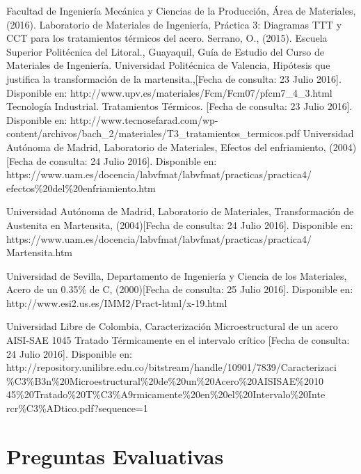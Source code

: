 \documentclass[a4paper, 9pt]{article}
\begin{document}
\newpage
\begin{thebibliography}{9}
  Facultad de Ingeniería Mecánica y Ciencias de la Producción, Área de Materiales, (2016). Laboratorio de Materiales de Ingeniería, Práctica 3: Diagramas TTT y CCT para los tratamientos térmicos del acero.	  
Serrano, O., (2015). Escuela Superior Politécnica del Litoral., Guayaquil, Guía de Estudio del Curso de Materiales de Ingeniería.
Universidad Politécnica de Valencia, Hipótesis que justifica la transformación de la martensita.,[Fecha de consulta: 23 Julio 2016]. Disponible en: http://www.upv.es/materiales/Fcm/Fcm07/pfcm7\_4\_3.html
Tecnología Industrial. Tratamientos Térmicos. [Fecha de consulta: 23 Julio 2016]. Disponible en: http://www.tecnosefarad.com/wp-content/archivos/bach\_2/materiales/T3\_tratamientos\_termicos.pdf
Universidad Autónoma de Madrid, Laboratorio de Materiales, Efectos del enfriamiento, (2004)[Fecha de consulta: 24 Julio 2016]. Disponible en: https://www.uam.es/docencia/labvfmat/labvfmat/practicas/practica4/\\efectos\%20del\%20enfriamiento.htm

Universidad Autónoma de Madrid, Laboratorio de Materiales, Transformación de Austenita en Martensita, (2004)[Fecha de consulta: 24 Julio 2016]. Disponible en: https://www.uam.es/docencia/labvfmat/labvfmat/practicas/practica4/\\Martensita.htm

Universidad de Sevilla, Departamento de Ingeniería y Ciencia de los Materiales, Acero de un 0.35\% de C, (2000)[Fecha de consulta: 25 Julio 2016]. Disponible en: http://www.esi2.us.es/IMM2/Pract-html/x-19.html


Universidad Libre de Colombia, Caracterización Microestructural de un acero AISI-SAE 1045 Tratado Térmicamente en el intervalo crítico [Fecha de consulta: 24 Julio 2016]. Disponible en: http://repository.unilibre.edu.co/bitstream/handle/10901/7839/Caracterizaci\\ \%C3\%B3n\%20Microestructural\%20de\%20un\%20Acero\%20AISISAE\%2010\\45\%20Tratado\%20T\%C3\%A9rmicamente\%20en\%20el\%20Intervalo\%20Inte\\rcr\%C3\%ADtico.pdf?sequence=1

\end{thebibliography}
\newpage
\section{Preguntas Evaluativas}
\end{document}
